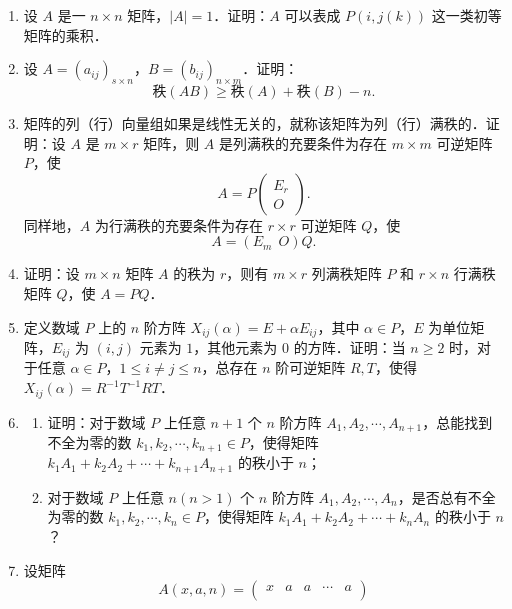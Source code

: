 \begin{enumerate}
\begin{enumerate}
\[      \tag{1}
    \]
    的矩阵的乘积．
  \anssub
    \item 设
    \[
      A=\begin{pmatrix}a&b\\c&d\end{pmatrix}
    \]
    为一复数矩阵，$|A|=1$．证明：$A$ 可以表成形如（1）式的矩阵的乘积．
  \anssub
  \end{enumerate}
  \item 设 $A$ 是一 $n\times n$ 矩阵，$|A|=1$．证明：$A$ 可以表成 $P(i,j(k))$ 这一类初等矩阵的乘积．
  \ansproof
  \item 设 $A=(a_{ij})_{s\times n}$，$B=(b_{ij})_{n\times m}$．证明：
  \[
    \text{秩}(AB)\geqslant\text{秩}(A)+\text{秩}(B)-n.
  \]
  \ansproof
  \item 矩阵的列（行）向量组如果是线性无关的，就称该矩阵为列（行）满秩的．证明：设 $A$ 是 $m\times r$ 矩阵，则 $A$ 是列满秩的充要条件为存在 $m\times m$ 可逆矩阵 $P$，使
  \[
    A=P\begin{pmatrix}E_r\\O\end{pmatrix}.
  \]
  同样地，$A$ 为行满秩的充要条件为存在 $r\times r$ 可逆矩阵 $Q$，使
  \[
    A=(E_m\ \ O)Q.
  \]
  \ansproof
  \item 证明：设 $m\times n$ 矩阵 $A$ 的秩为 $r$，则有 $m\times r$ 列满秩矩阵 $P$ 和 $r\times n$ 行满秩矩阵 $Q$，使 $A=PQ$．
  \ansproof
  \item 定义数域 $P$ 上的 $n$ 阶方阵 $X_{ij}(\alpha)=E+\alpha E_{ij}$，其中 $\alpha\in P$，$E$ 为单位矩阵，$E_{ij}$ 为 $(i,j)$ 元素为 $1$，其他元素为 $0$ 的方阵．证明：当 $n\geqslant2$ 时，对于任意 $\alpha\in P$，$1\leqslant i\neq j\leqslant n$，总存在 $n$ 阶可逆矩阵 $R,T$，使得 $X_{ij}(\alpha)=R^{-1}T^{-1}RT$．
  \ansproof
  \item
  \begin{enumerate}
    \item 证明：对于数域 $P$ 上任意 $n+1$ 个 $n$ 阶方阵 $A_1,A_2,\cdots,A_{n+1}$，总能找到不全为零的数 $k_1,k_2,\cdots,k_{n+1}\in P$，使得矩阵 $k_1A_1+k_2A_2+\cdots+k_{n+1}A_{n+1}$ 的秩小于 $n$；
  \anssub
    \item 对于数域 $P$ 上任意 $n(n>1)$ 个 $n$ 阶方阵 $A_1,A_2,\cdots,A_n$，是否总有不全为零的数 $k_1,k_2,\cdots,k_n\in P$，使得矩阵 $k_1A_1+k_2A_2+\cdots+k_nA_n$ 的秩小于 $n$？
  \anssub
  \end{enumerate}
  \item 设矩阵
  \[
    A(x,a,n)=\begin{pmatrix}
      x&a&a&\cdots&a\\

\end{pmatrix}\]
\end{enumerate}
